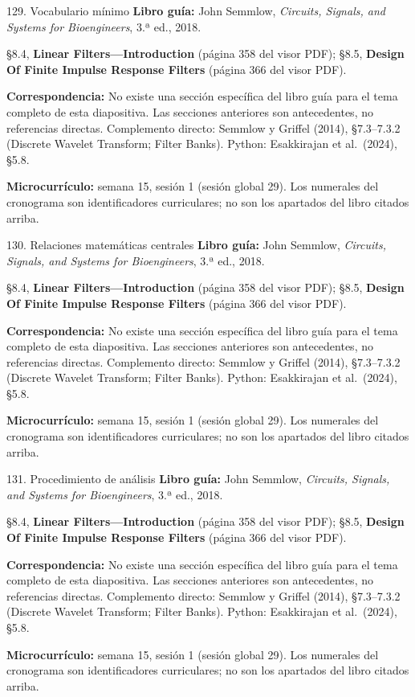 \documentclass[
  10pt,
  ignorenonframetext,
  aspectratio=169,
  spanish,
]{beamer}
\begin{document}
\begin{frame}{129. Vocabulario mínimo}
\label{vocabulario-muxednimo-8}
\textbf{Libro guía:} John Semmlow, \emph{Circuits, Signals, and Systems
for Bioengineers}, 3.ª ed., 2018.

§8.4, \textbf{Linear Filters---Introduction} (página 358 del visor PDF);
§8.5, \textbf{Design Of Finite Impulse Response Filters} (página 366 del
visor PDF).

\textbf{Correspondencia:} No existe una sección específica del libro
guía para el tema completo de esta diapositiva. Las secciones anteriores
son antecedentes, no referencias directas. Complemento directo: Semmlow
y Griffel (2014), §7.3--7.3.2 (Discrete Wavelet Transform; Filter
Banks). Python: Esakkirajan et al.~(2024), §5.8.

\textbf{Microcurrículo:} semana 15, sesión 1 (sesión global 29). Los
numerales del cronograma son identificadores curriculares; no son los
apartados del libro citados arriba.
\end{frame}

\begin{frame}{130. Relaciones matemáticas centrales}
\label{relaciones-matemuxe1ticas-centrales-8}
\textbf{Libro guía:} John Semmlow, \emph{Circuits, Signals, and Systems
for Bioengineers}, 3.ª ed., 2018.

§8.4, \textbf{Linear Filters---Introduction} (página 358 del visor PDF);
§8.5, \textbf{Design Of Finite Impulse Response Filters} (página 366 del
visor PDF).

\textbf{Correspondencia:} No existe una sección específica del libro
guía para el tema completo de esta diapositiva. Las secciones anteriores
son antecedentes, no referencias directas. Complemento directo: Semmlow
y Griffel (2014), §7.3--7.3.2 (Discrete Wavelet Transform; Filter
Banks). Python: Esakkirajan et al.~(2024), §5.8.

\textbf{Microcurrículo:} semana 15, sesión 1 (sesión global 29). Los
numerales del cronograma son identificadores curriculares; no son los
apartados del libro citados arriba.
\end{frame}

\begin{frame}{131. Procedimiento de análisis}
\label{procedimiento-de-anuxe1lisis-8}
\textbf{Libro guía:} John Semmlow, \emph{Circuits, Signals, and Systems
for Bioengineers}, 3.ª ed., 2018.

§8.4, \textbf{Linear Filters---Introduction} (página 358 del visor PDF);
§8.5, \textbf{Design Of Finite Impulse Response Filters} (página 366 del
visor PDF).

\textbf{Correspondencia:} No existe una sección específica del libro
guía para el tema completo de esta diapositiva. Las secciones anteriores
son antecedentes, no referencias directas. Complemento directo: Semmlow
y Griffel (2014), §7.3--7.3.2 (Discrete Wavelet Transform; Filter
Banks). Python: Esakkirajan et al.~(2024), §5.8.

\textbf{Microcurrículo:} semana 15, sesión 1 (sesión global 29). Los
numerales del cronograma son identificadores curriculares; no son los
apartados del libro citados arriba.
\end{frame}
\end{document}
